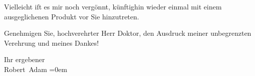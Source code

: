 \pstart
           Vielleicht iſt es mir noch vergönnt, künftighin wieder einmal mit einem
               ausgeglichenen Produkt vor Sie hinzutreten.\pend
           
\pstart
           Genehmigen Sie, hochverehrter Herr {\pb}Doktor, den
               Ausdruck meiner unbegrenzten Verehrung und meines Dankes!\pend
           
\pstart
           Ihr ergebener{\\[\baselineskip]}\spacefill\mbox{Robert Adam}\pend
           \leftskip=0em{}\endnumbering{}  \newcommand{\dateiname}{L02136}\newcommand{\titel}{Robert Adam an Arthur Schnitzler, 7. 5. 1913}\newcommand{\editorInnen}{Martin Anton Müller und Gerd-Hermann Susen}
